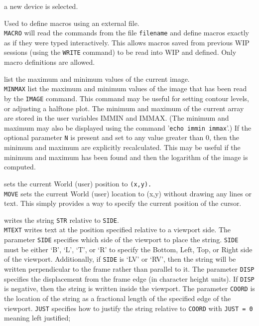 	a new device is selected.
\item [{\tt MACRO filename } --] Used to define macros using an external file.\\
	{\tt MACRO} will read the commands from the file
	{\tt filename} and define macros exactly as if they were
	typed interactively.  This allows macros saved from previous WIP
	sessions (using the {\tt WRITE} command)
	to be read into WIP and defined.  Only macro definitions are allowed.
\item [{\tt MINMAX [N] } --] list the maximum and minimum values of the current image.\\
	{\tt MINMAX} list the maximum and minimum values of the
	image that has been read by the {\tt IMAGE}
	command.  This command may be useful for setting contour levels,
	or adjusting a halftone plot.  The minimum and maximum of the
	current array are stored in the user variables IMMIN and IMMAX.
	(The minimum and maximum may also be displayed using the command
	'{\tt echo immin immax}'.)  If the
	optional parameter {\tt N} is present and set to any value
	greater than 0, then the minimum and maximum are explicitly
	recalculated.  This may be useful if the minimum and maximum has
	been found and then the logarithm of the image is computed.
\item [{\tt MOVE X Y } --] sets the current World (user) position to {\tt (x,y).}\\
	{\tt MOVE} sets the current World (user) location to (x,y)
	without drawing any lines or text.  This simply provides a way to
	specify the current position of the cursor.
\item [{\tt MTEXT side disp coord just str } --] writes the string {\tt STR} relative to {\tt SIDE}.\\
	{\tt MTEXT} writes text at the position specified relative
	to a viewport side.  The parameter {\tt SIDE} specifies
	which side of the viewport to place the string.  {\tt SIDE}
	must be either `B', `L', `T', or `R' to specify the
	Bottom, Left, Top, or Right side of the viewport.
	Additionally, if {\tt SIDE} is `LV' or `RV', then the string
	will be written perpendicular to the frame rather than parallel
	to it.  The parameter {\tt DISP} specifies the displacement
	from the frame edge (in character height units).  If {\tt DISP}
	is negative, then the string is written inside the viewport.  The
	parameter {\tt COORD} is the location of the string as a
	fractional length of the specified edge of the viewport.
	{\tt JUST} specifies how to justify the string relative to
	{\tt COORD} with {\tt JUST = 0} meaning left justified;

